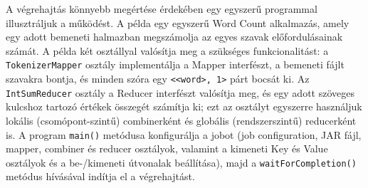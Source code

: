 \documentclass[
]{article}
\begin{document}
A végrehajtás könnyebb megértése érdekében egy egyszerű programmal
illusztráljuk a működést. A példa egy egyszerű Word Count alkalmazás,
amely egy adott bemeneti halmazban megszámolja az egyes szavak
előfordulásainak számát. A példa két osztállyal valósítja meg a
szükséges funkcionalitást: a \texttt{TokenizerMapper} osztály
implementálja a Mapper interfészt, a bemeneti fájlt szavakra bontja, és
minden szóra egy
\texttt{\textless{}\textless{}word\textgreater{},\ 1\textgreater{}} párt
bocsát ki. Az \texttt{IntSumReducer} osztály a Reducer interfészt
valósítja meg, és egy adott szöveges kulcshoz tartozó értékek összegét
számítja ki; ezt az osztályt egyszerre használjuk lokális
(csomópont-szintű) combinerként és globális (rendszerszintű) reducerként
is. A program \texttt{main()} metódusa konfigurálja a jobot (job
configuration, JAR fájl, mapper, combiner és reducer osztályok, valamint
a kimeneti Key és Value osztályok és a be-/kimeneti útvonalak
beállítása), majd a \texttt{waitForCompletion()} metódus hívásával
indítja el a végrehajtást.
\end{document}
